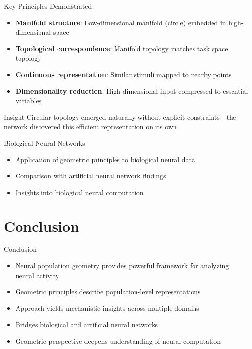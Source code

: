 \documentclass[aspectratio=169]{beamer}
\begin{document}
\begin{frame}{Key Principles Demonstrated}
    \begin{itemize}
        \item \textbf{Manifold structure}: Low-dimensional manifold (circle) embedded in high-dimensional space
        \item \textbf{Topological correspondence}: Manifold topology matches task space topology
        \item \textbf{Continuous representation}: Similar stimuli mapped to nearby points
        \item \textbf{Dimensionality reduction}: High-dimensional input compressed to essential variables
    \end{itemize}
    \vspace{0.5cm}
    \begin{block}{Insight}
        Circular topology emerged naturally without explicit constraints—the network discovered this efficient representation on its own
    \end{block}
\end{frame}

\begin{frame}{Biological Neural Networks}
    \begin{itemize}
        \item Application of geometric principles to biological neural data
        \item Comparison with artificial neural network findings
        \item Insights into biological neural computation
    \end{itemize}
\end{frame}

\section{Conclusion}

\begin{frame}{Conclusion}
    \begin{itemize}
        \item Neural population geometry provides powerful framework for analyzing neural activity
        \item Geometric principles describe population-level representations
        \item Approach yields mechanistic insights across multiple domains
        \item Bridges biological and artificial neural networks
        \item Geometric perspective deepens understanding of neural computation
    \end{itemize}
\end{frame}
\end{document}
